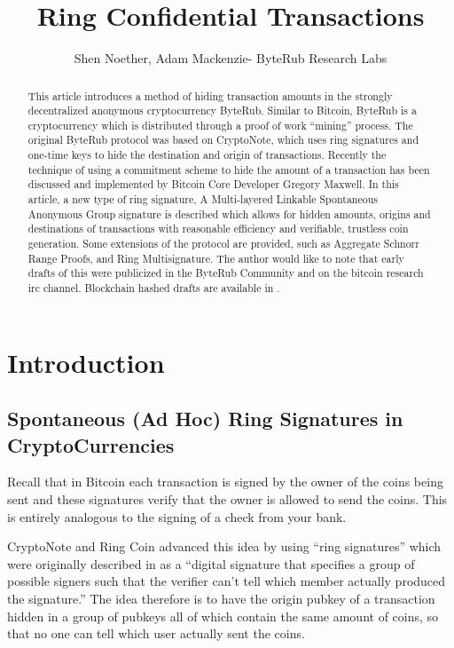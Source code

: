 \documentclass[12pt,oneside,english]{amsart}
\numberwithin{equation}{section}
\numberwithin{figure}{section}
\theoremstyle{plain}
\theoremstyle{plain}
\theoremstyle{remark}
\theoremstyle{plain}
\theoremstyle{remark}
\theoremstyle{remark}
\theoremstyle{plain}
\theoremstyle{definition}
\begin{document}
\title{Ring Confidential Transactions}


\author{Shen Noether, Adam Mackenzie- ByteRub Research Labs}
\begin{abstract}
This article introduces a method of hiding transaction amounts in
the strongly decentralized anonymous cryptocurrency ByteRub. Similar
to Bitcoin, ByteRub is a cryptocurrency which is distributed through
a proof of work ``mining'' process. The original ByteRub protocol
was based on CryptoNote, which uses ring signatures and one-time keys
to hide the destination and origin of transactions. Recently the technique
of using a commitment scheme to hide the amount of a transaction has
been discussed and implemented by Bitcoin Core Developer Gregory Maxwell.
In this article, a new type of ring signature, A Multi-layered Linkable
Spontaneous Anonymous Group signature is described which allows for hidden
amounts, origins and destinations of transactions with reasonable
efficiency and verifiable, trustless coin generation. Some extensions of the protocol are provided, such as Aggregate Schnorr Range Proofs, and Ring Multisignature. The author would like to note that early drafts of this were publicized in the ByteRub Community and on the bitcoin research irc channel. Blockchain hashed drafts are available in \cite{Snoe}.
\end{abstract}

\maketitle

\tableofcontents
\section{Introduction}


\subsection{Spontaneous (Ad Hoc) Ring Signatures in CryptoCurrencies}

Recall that in Bitcoin each transaction is signed by the owner of
the coins being sent and these signatures verify that the owner is
allowed to send the coins. This is entirely analogous to the signing
of a check from your bank.

CryptoNote \cite{CN} and Ring Coin
\cite{B2} advanced this idea by using ``ring signatures'' which were originally described
in \cite{RST} as a ``digital signature that specifies a group of
possible signers such that the verifier can't tell which member actually
produced the signature.'' The idea therefore is to have the origin
pubkey of a transaction hidden in a group of pubkeys all of which contain
the same amount of coins, so that no one can tell which user actually
sent the coins. 
\end{document}
